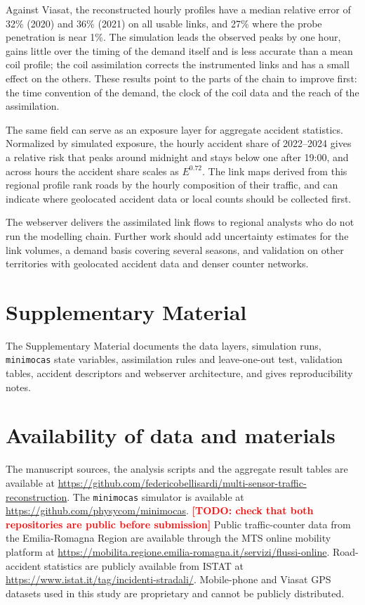 \documentclass[pdflatex,Numbered]{sn-jnl}
\newcommand{\todo}[1]{\textcolor{red}{\textbf{[TODO: #1]}}}
\begin{document}
Against Viasat, the reconstructed hourly profiles have a median relative error of 32\% (2020) and 36\% (2021) on all usable links, and 27\% where the probe penetration is near 1\%. The simulation leads the observed peaks by one hour, gains little over the timing of the demand itself and is less accurate than a mean coil profile; the coil assimilation corrects the instrumented links and has a small effect on the others. These results point to the parts of the chain to improve first: the time convention of the demand, the clock of the coil data and the reach of the assimilation.

The same field can serve as an exposure layer for aggregate accident statistics. Normalized by simulated exposure, the hourly accident share of 2022--2024 gives a relative risk that peaks around midnight and stays below one after 19:00, and across hours the accident share scales as $E^{0.72}$. The link maps derived from this regional profile rank roads by the hourly composition of their traffic, and can indicate where geolocated accident data or local counts should be collected first.

The webserver delivers the assimilated link flows to regional analysts who do not run the modelling chain. Further work should add uncertainty estimates for the link volumes, a demand basis covering several seasons, and validation on other territories with geolocated accident data and denser counter networks.


\section*{Supplementary Material}

The Supplementary Material documents the data layers, simulation runs, \texttt{minimocas} state variables, assimilation rules and leave-one-out test, validation tables, accident descriptors and webserver architecture, and gives reproducibility notes.

\section*{Availability of data and materials}

The manuscript sources, the analysis scripts and the aggregate result tables are available at \url{https://github.com/federicobellisardi/multi-sensor-traffic-reconstruction}. The \texttt{minimocas} simulator is available at \url{https://github.com/physycom/minimocas}. \todo{check that both repositories are public before submission} Public traffic-counter data from the Emilia-Romagna Region are available through the MTS online mobility platform at \url{https://mobilita.regione.emilia-romagna.it/servizi/flussi-online}. Road-accident statistics are publicly available from ISTAT at \url{https://www.istat.it/tag/incidenti-stradali/}. Mobile-phone and Viasat GPS datasets used in this study are proprietary and cannot be publicly distributed.
\end{document}
